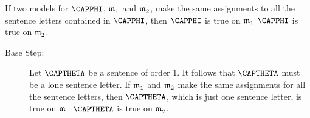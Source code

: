 \begin{THEOREM}{}
	If two models for $\CAPPHI$, $\mathfrak{m^{\mathrm{}}_{\mathrm{1}}}$ and $\mathfrak{m^{\mathrm{}}_{\mathrm{2}}}$, make the same assignments to all the sentence letters contained in $\CAPPHI$, then $\CAPPHI$ is true on $\mathfrak{m^{\mathrm{}}_{\mathrm{1}}}$ \Iff $\CAPPHI$ is true on $\mathfrak{m^{\mathrm{}}_{\mathrm{2}}}$.
\end{THEOREM}
\begin{PROOF}
	\begin{description}
		\item[Base Step:]  Let $\CAPTHETA$ be a \GSL{} sentence of order 1.  It follows that $\CAPTHETA$ must be a lone sentence letter.  If $\mathfrak{m^{\mathrm{}}_{\mathrm{1}}}$ and $\mathfrak{m^{\mathrm{}}_{\mathrm{2}}}$ make the same assignments for all the sentence letters, then $\CAPTHETA$, which is just one sentence letter, is true on $\mathfrak{m^{\mathrm{}}_{\mathrm{1}}}$ \Iff $\CAPTHETA$ is true on $\mathfrak{m^{\mathrm{}}_{\mathrm{2}}}$.
		

\end{description}
\end{PROOF}
